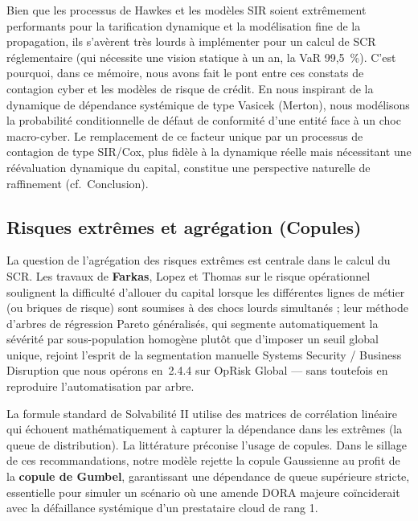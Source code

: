 \documentclass[11pt,a4paper]{article}
\theoremstyle{navystyle}
\theoremstyle{navydef}
\begin{document}
Bien que les processus de Hawkes et les modèles SIR soient extrêmement performants pour la tarification dynamique et la modélisation fine de la propagation, ils s'avèrent très lourds à implémenter pour un calcul de SCR réglementaire (qui nécessite une vision statique à un an, la VaR 99,5~\%). C'est pourquoi, dans ce mémoire, nous avons fait le pont entre ces constats de contagion cyber et les modèles de risque de crédit. En nous inspirant de la dynamique de dépendance systémique de type Vasicek (Merton), nous modélisons la probabilité conditionnelle de défaut de conformité d'une entité face à un choc macro-cyber. Le remplacement de ce facteur unique par un processus de contagion de type SIR/Cox, plus fidèle à la dynamique réelle mais nécessitant une réévaluation dynamique du capital, constitue une perspective naturelle de raffinement (cf.~Conclusion).

\subsection{Risques extrêmes et agrégation (Copules)}

La question de l'agrégation des risques extrêmes est centrale dans le calcul du SCR. Les travaux de \textbf{Farkas}, Lopez et Thomas \citep{FarkasLopezThomas2021} sur le risque opérationnel soulignent la difficulté d'allouer du capital lorsque les différentes lignes de métier (ou briques de risque) sont soumises à des chocs lourds simultanés ; leur méthode d'arbres de régression Pareto généralisés, qui segmente automatiquement la sévérité par sous-population homogène plutôt que d'imposer un seuil global unique, rejoint l'esprit de la segmentation manuelle Systems Security / Business Disruption que nous opérons en~2.4.4 sur OpRisk Global --- sans toutefois en reproduire l'automatisation par arbre.

La formule standard de Solvabilité II utilise des matrices de corrélation linéaire qui échouent mathématiquement à capturer la dépendance dans les extrêmes (la queue de distribution). La littérature préconise l'usage de copules. Dans le sillage de ces recommandations, notre modèle rejette la copule Gaussienne au profit de la \textbf{copule de Gumbel}, garantissant une dépendance de queue supérieure stricte, essentielle pour simuler un scénario où une amende DORA majeure coïnciderait avec la défaillance systémique d'un prestataire cloud de rang 1.
\end{document}
